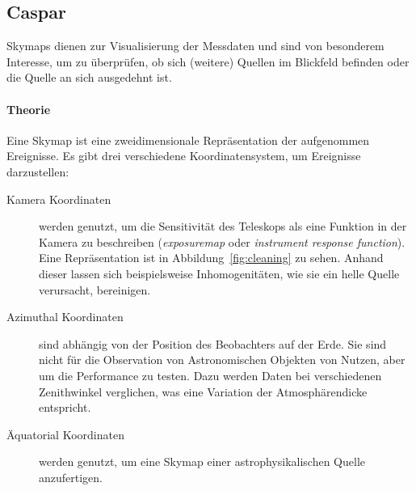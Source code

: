 \subsection{Caspar}%
\label{sub:caspar}


Skymaps dienen zur Visualisierung der Messdaten und sind von besonderem
Interesse, um zu überprüfen, ob sich (weitere) Quellen im Blickfeld befinden
oder die Quelle an sich ausgedehnt ist.

\paragraph{Theorie}%

Eine Skymap ist eine zweidimensionale Repräsentation der aufgenommen Ereignisse.
Es gibt drei verschiedene Koordinatensystem, um Ereignisse darzustellen:

\begin{description}
  \item[\quad Kamera Koordinaten] werden genutzt, um die Sensitivität des
    Teleskops
    als eine Funktion in der Kamera zu beschreiben
    (\textit{exposuremap} oder \textit{instrument response function}).
    Eine Repräsentation ist in Abbildung~\ref{fig:cleaning} zu sehen.
    Anhand dieser lassen sich beispielsweise Inhomogenitäten,
    wie sie ein helle Quelle verursacht, bereinigen.
  \item[\quad Azimuthal Koordinaten] sind abhängig von der Position des
    Beobachters auf der Erde.
    Sie sind nicht für die Observation von Astronomischen Objekten von Nutzen,
    aber um die Performance zu testen.
    Dazu werden Daten bei verschiedenen Zenithwinkel verglichen,
    was eine Variation der Atmosphärendicke entspricht.
  \item[\quad Äquatorial Koordinaten] werden genutzt, um eine Skymap einer astrophysikalischen Quelle anzufertigen.
\end{description}

